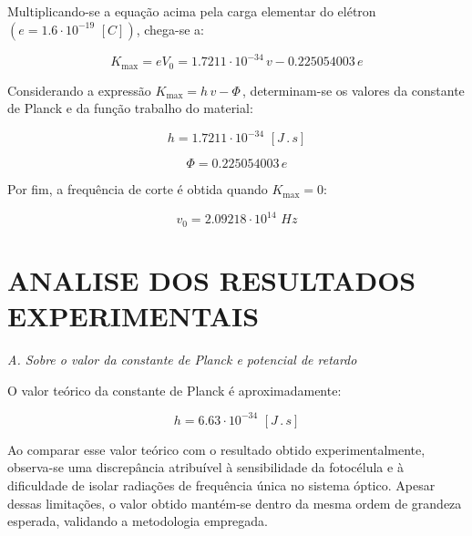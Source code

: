 \documentclass[10pt,twocolumn,letterpaper]{article}
\begin{document}
\hspace{1cm} Multiplicando-se a equação acima pela carga elementar do elétron $(e = 1.6 \cdot 10^{-19} \,\, [C])$, chega-se a:

\begin{equation*}
    K_{\max} = eV_0 = 1.7211 \cdot 10^{-34}\,v - 0.225054003\,e
\end{equation*}

\hspace{1cm} Considerando a expressão $K_{\max} = h\,v - \Phi\,$, determinam-se os valores da constante de Planck e da função trabalho do material:

\begin{equation*}
    h = 1.7211\cdot 10^{-34} \,\, [J\,.\,s]
\end{equation*}

\begin{equation*}
    \Phi = 0.225054003\,e
\end{equation*}

\noindent Por fim, a frequência de corte é obtida quando $K_{\max} = 0$:

\begin{equation*}
    v_0 = 2.09218 \cdot 10^{14} \,\, Hz
\end{equation*}


\section{ANALISE DOS RESULTADOS EXPERIMENTAIS}

\noindent\textit{A. Sobre o valor da constante de Planck e potencial de
retardo}

\noindent O valor teórico da constante de Planck é aproximadamente:

\vspace{-.3cm}

\begin{equation*}
    h = 6.63 \cdot 10^{-34} \,\, [J\,.\,s]
\end{equation*}

\vspace{-.22cm}

\hspace{1cm} Ao comparar esse valor teórico com o resultado obtido experimentalmente, observa-se uma discrepância atribuível à sensibilidade da fotocélula e à dificuldade de isolar radiações de frequência única no sistema óptico. Apesar dessas limitações, o valor obtido mantém-se dentro da mesma ordem de grandeza esperada, validando a metodologia empregada.
\end{document}
